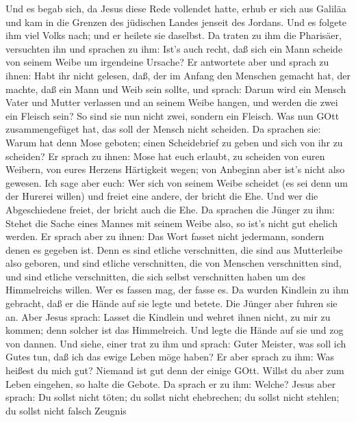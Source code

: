  Und es begab sich, da Jesus diese Rede vollendet hatte,
erhub er sich aus Galiläa und kam in die Grenzen des jüdischen Landes
jenseit des Jordans.  Und es folgete ihm viel Volks nach;
und er heilete sie daselbst.  Da traten zu ihm die
Pharisäer, versuchten ihn und sprachen zu ihm: Ist's auch recht, daß
sich ein Mann scheide von seinem Weibe um irgendeine Ursache?
 Er antwortete aber und sprach zu ihnen: Habt ihr nicht
gelesen, daß, der im Anfang den Menschen gemacht hat, der machte, daß
ein Mann und Weib sein sollte,  und sprach: Darum wird ein
Mensch Vater und Mutter verlassen und an seinem Weibe hangen, und werden
die zwei ein Fleisch sein?  So sind sie nun nicht zwei,
sondern ein Fleisch. Was nun GOtt zusammengefüget hat, das soll der
Mensch nicht scheiden.  Da sprachen sie: Warum hat denn Mose
geboten; einen Scheidebrief zu geben und sich von ihr zu scheiden?
 Er sprach zu ihnen: Mose hat euch erlaubt, zu scheiden von
euren Weibern, von eures Herzens Härtigkeit wegen; von Anbeginn aber
ist's nicht also gewesen.  Ich sage aber euch: Wer sich von
seinem Weibe scheidet (es sei denn um der Hurerei willen) und freiet
eine andere, der bricht die Ehe. Und wer die Abgeschiedene freiet, der
bricht auch die Ehe.  Da sprachen die Jünger zu ihm: Stehet
die Sache eines Mannes mit seinem Weibe also, so ist's nicht gut ehelich
werden.  Er sprach aber zu ihnen: Das Wort fasset nicht
jedermann, sondern denen es gegeben ist.  Denn es sind
etliche verschnitten, die sind aus Mutterleibe also geboren, und sind
etliche verschnitten, die von Menschen verschnitten sind, und sind
etliche verschnitten, die sich selbst verschnitten haben um des
Himmelreichs willen. Wer es fassen mag, der fasse es.  Da
wurden Kindlein zu ihm gebracht, daß er die Hände auf sie legte und
betete. Die Jünger aber fuhren sie an.  Aber Jesus sprach:
Lasset die Kindlein und wehret ihnen nicht, zu mir zu kommen; denn
solcher ist das Himmelreich.  Und legte die Hände auf sie
und zog von dannen.  Und siehe, einer trat zu ihm und
sprach: Guter Meister, was soll ich Gutes tun, daß ich das ewige Leben
möge haben?  Er aber sprach zu ihm: Was heißest du mich
gut? Niemand ist gut denn der einige GOtt. Willst du aber zum Leben
eingehen, so halte die Gebote.  Da sprach er zu ihm:
Welche? Jesus aber sprach: Du sollst nicht töten; du sollst nicht
ehebrechen; du sollst nicht stehlen; du sollst nicht falsch Zeugnis
